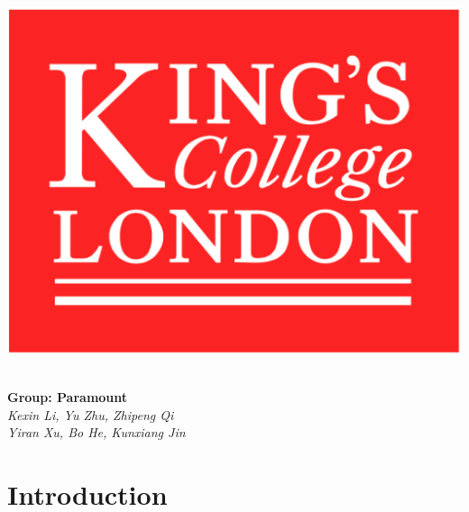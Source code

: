 \documentclass[11pt]{article}
\begin{document}
	
	\begin{titlepage}
		\includegraphics*[scale=0.5]{cover.png}
		\begin{center}
			\vspace{5cm}
			 \\[8mm]
			\huge\textbf{Group: Paramount} \\[5mm]
			\large\emph{Kexin Li, Yu Zhu, Zhipeng Qi} \\[5mm]
			\large\emph{Yiran Xu, Bo He, Kunxiang Jin} \\[5mm]
		\end{center}
	\end{titlepage}

\tableofcontents

\setlength{\parindent}{0pt}
\clearpage
\section{Introduction}
\end{document}
